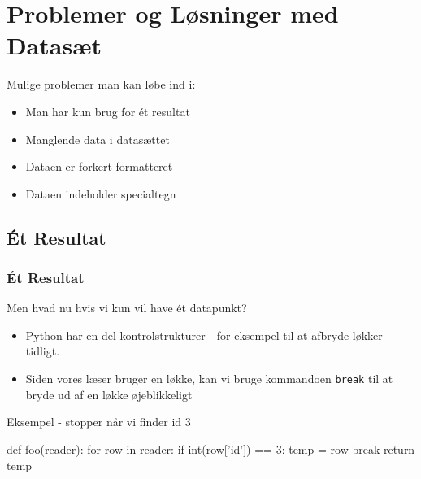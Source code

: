 \documentclass[aspectratio=169,12pt,t]{beamer}
\begin{document}
\section{Problemer og Løsninger med Datasæt}
\begin{frame}
\begin{block}{Mulige problemer man kan løbe ind i:}
  \begin{itemize}
    \item Man har kun brug for ét resultat 
    \item Manglende data i datasættet
    \item Dataen er forkert formatteret %
    \item Dataen indeholder specialtegn
  \end{itemize}
\end{block} 
\end{frame}

\subsection{Ét Resultat}
\begin{frame}[fragile]
\vspace*{-12pt}
  \frametitle{Ét Resultat}
  \begin{block}{Men hvad nu hvis vi kun vil have ét datapunkt?}
    \begin{itemize}
      \item Python har en del kontrolstrukturer - for eksempel til at afbryde 
            løkker tidligt.
      \item Siden vores læser bruger en løkke, kan vi bruge kommandoen 
            {\tt break} til at bryde ud af en løkke øjeblikkeligt
    \end{itemize}
  \end{block}
  \begin{block}{Eksempel - stopper når vi finder id 3}
    \begin{python}
def foo(reader):
    for row in reader:
        if int(row['id']) == 3:
            temp = row
            break
    return temp
    \end{python}
  \end{block}
\end{frame}
\end{document}

